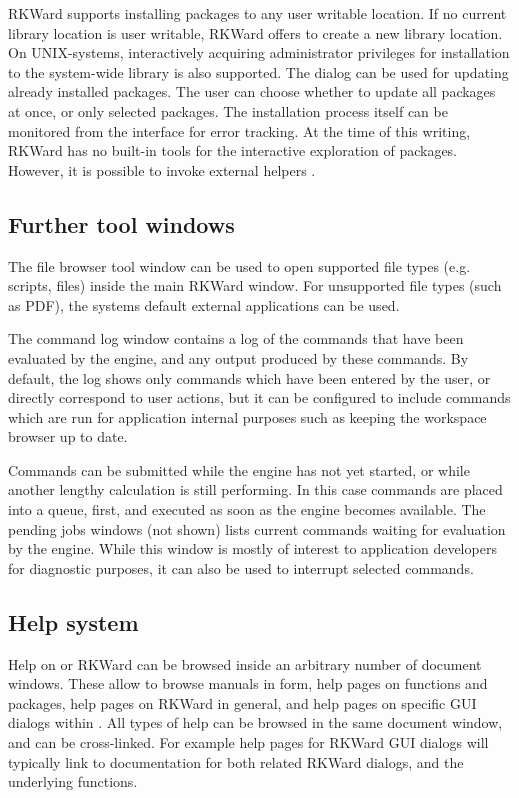 RKWard supports installing packages to any user writable location. If no current
library location is user writable, RKWard offers to create a new library
location. On UNIX-systems, interactively acquiring administrator privileges for
installation to the system-wide library is also supported. The dialog can be
used for updating already installed packages. The user can choose whether to
update all packages at once, or only selected packages. The installation process
itself can be monitored from the interface for error tracking. At the time of this writing, RKWard has no
built-in tools for the interactive exploration of  packages. However, it is
possible to invoke external helpers \citep{Zhang2004}.

\subsection{Further tool windows}
\label{sec:further_tool_windows}

The file browser tool window can be
used to open supported file types (e.g. 
scripts,  files) inside the main RKWard
window. For unsupported file types (such as PDF), the
systems default external applications can be used.

The command log window contains a log of the commands that have been
evaluated by the  engine, and any output
produced by these commands. By default, the log shows only commands
which have been entered by the user, or directly correspond to user
actions, but it can be configured to include commands which are run for
application internal purposes such as keeping the workspace browser up
to date.

Commands can be submitted while the  engine
has not yet started, or while another lengthy calculation is still
performing. In this case commands are placed into a queue, first, and
executed as soon as the  engine becomes
available. The pending jobs windows (not
shown) lists current  commands waiting for
evaluation by the  engine. While this
window is mostly of interest to application developers for diagnostic
purposes, it can also be used to interrupt selected commands.

\subsection{Help system}
\label{sec:help_system}
Help on 
or RKWard can be browsed inside an arbitrary number of document
windows. These allow to browse  manuals in
 form, help pages on
 functions and packages, help pages on
RKWard in general, and help pages on specific GUI dialogs within
. All types of help can be browsed in the
same document window, and can be cross-linked. For example help pages for
RKWard GUI dialogs will typically link to documentation for both
related RKWard dialogs, and the underlying
 functions.

